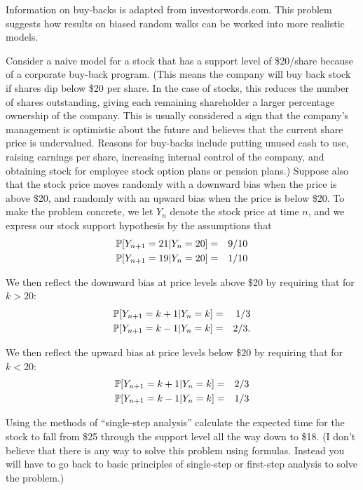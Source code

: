 \begin{problem}
  Information on buy-backs is adapted from investorwords.com.
  This problem suggests how results on biased random walks
  can be worked into more realistic models.
        
  Consider a naive model for a stock that has a support level
  of \$20/share because of a corporate buy-back program.
  (This means the company will buy back stock if shares dip
  below \$20 per share.   In the case of stocks, this reduces
  the number of shares outstanding, giving each remaining
  shareholder a larger percentage ownership of the
  company. This is usually considered a sign that the
  company's management is optimistic about the future and
  believes that the current share price is
  undervalued. Reasons for buy-backs include putting unused
  cash to use, raising earnings per share, increasing internal
  control of the company, and obtaining stock for employee
  stock option plans or pension plans.)   Suppose also that the
  stock price moves randomly with a downward bias when the
  price is above \$20, and randomly with an upward bias when
  the price is below \$20.  To make the problem concrete, we
  let $Y_n$ denote the stock price at time $n$, and we express
  our stock support hypothesis by the assumptions that
  \begin{eqnarray*}
   \P[ Y_{n+1} = 21 | Y_{n} = 20] &=& 9/10 \\
   \P[ Y_{n+1} = 19 | Y_{n} = 20] &=& 1/10
  \end{eqnarray*}
        
  We then reflect the downward bias at price levels above
  \$20 by requiring that for $k > 20$:
  \begin{eqnarray*}
   \P[ Y_{n+1} = k+1 | Y_{n} = k ] &=& 1/3 \\
   \P[ Y_{n+1} = k-1 | Y_{n} = k ] &=& 2/3.
  \end{eqnarray*}
        
  We then reflect the upward bias at price levels below \$20
  by requiring that for $k < 20$:
  \begin{eqnarray*}
   \P[ Y_{n+1} = k+1 | Y_{n} = k ] &=& 2/3 \\
   \P[ Y_{n+1} = k-1 | Y_{n} = k ] &=& 1/3
  \end{eqnarray*}

  Using the methods of ``single-step analysis'' calculate the
  expected time for the stock to fall from \$25 through the
  support level all the way down to \$18.
  (I don't believe that there is any way to solve this problem
  using formulas.  Instead you will have to go back to basic
  principles of single-step or first-step analysis to solve
  the problem.)
\end{problem} 
